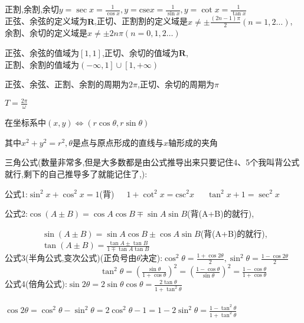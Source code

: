 \documentclass[UTF8]{ctexart}
\begin{document}
正割,余割,余切$\displaystyle y=\sec x=\frac{1}{\cos x} ,y=\text{cse} x =\frac{1}{\sin x},y=\cot x=\frac{1}{\tan x}$\\

正弦、余弦的定义域为$\mathbf{R} $,正切、正割割的定义域是$x\neq \pm \frac{(2n-1)\pi}{2}(n=1,2\ldots )$,\\余割、余切的定义域是$x\neq \pm 2n\pi(n=0,1,2\ldots)$

正弦、余弦的值域为$\left[1,1\right] $,正切、余切的值域为$\mathbf{R} $,\\正割、余割的值域为$ \left(-\infty ,1 \right]\cup\left[1,+\infty \right)  $

正弦、余弦、正割、余割的周期为$2\pi$,正切、余切的周期为$\pi$

$T=\frac{2\pi}{\omega }$

在坐标系中$(x,y)\Leftrightarrow (r\cos \theta ,r\sin \theta )$

其中$x^2+y^2=r^2,\theta \text{是点与原点形成的直线与$x$轴形成的夹角}$

三角公式(数量非常多,但是大多数都是由公式推导出来只要记住4、5个我叫背公式就行,剩下的自己推导多了就能记住了,):

公式1:$ \sin^2 x+\cos^2 x=1$(背)\ \ \ $1+\cot^2 x=\text{csc}^2 x$\ \ \ $\tan^2 x +1=\sec^2 x$

公式2:$\cos(A\pm B)=\cos A \cos B \mp \sin A \sin B$(背(A+B)的就行),

\ \ \ \ \ \ \ \ \ $\sin (A\pm B)=\sin A \cos B \pm\cos A \sin B$(背(A+B)的就行),\\

\ \ \ \ \ \ \ \ \ $\displaystyle \tan (A\pm B)=\frac{\tan A \pm \tan B}{1\mp \tan A\tan B}$\\

公式3(半角公式,变次公式)(正负号由$\theta $决定):$\displaystyle \cos ^{2}\theta =\frac{1+\cos 2\theta }{2},\sin ^{2}\theta =\frac{1-\cos 2\theta }{2}$\\

\ \ \ \ \ \ \ \ \ \ \ \ \ \ \ \ \ \ \ \ \ \ \ $\displaystyle \tan ^{2}\theta =(\frac{\sin \theta}{1+\cos \theta})^{2}=(\frac{1-\cos \theta}{\sin \theta})^{2}=\frac{1-\cos \theta}{1+\cos \theta}$\\

公式4(倍角公式):$\displaystyle \sin 2\theta =2\sin\theta \cos \theta =\frac{2\tan \theta}{1+\tan^{2}\theta}$\\

\ \ \ \ \ \ \ \ \ \ \ \ \ \ \ \ \ \ \ \ \ \ \ $\displaystyle \cos 2\theta =\cos ^{2}\theta -\sin ^{2}\theta =2\cos ^{2}\theta -1=1-2\sin^{2}\theta=\frac{1-\tan^{2}\theta}{1+\tan^{2}\theta}$\\
\end{document}
